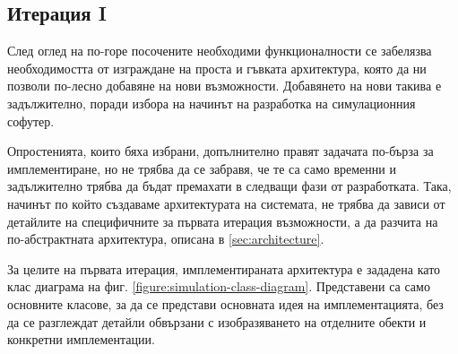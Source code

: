 	\subsection{Итерация I}
	
		След оглед на по-горе посочените необходими функционалности се забелязва необходимостта от 
		изграждане на проста и гъвката архитектура, която да ни позволи по-лесно добавяне на нови възможности. 
		Добавянето на нови такива е задължително, поради избора на начинът на разработка на симулационния софутер. 		
		
		Опростенията, които бяха избрани, допълнително правят задачата по-бърза за имплементиране,
		но не трябва да се забравя, че те са само временни и задължително трябва да бъдат премахати
		в следващи фази от разработката. Така, начинът по който създаваме архитектурата
		на системата, не трябва да зависи от детайлите на специфичните за първата итерация
		възможности, а да разчита на по-абстрактната архитектура, описана в \ref{sec:architecture}.
		
		За целите на първата итерация, имплементираната архитектура е зададена като клас диаграма на фиг. \ref{figure:simulation-class-diagram}.
		Представени са само основните класове, за да се представи основната идея на имплементацията, без
		да се разглеждат детайли обвързани с изобразяването на отделните обекти и конкретни имплементации.
		
